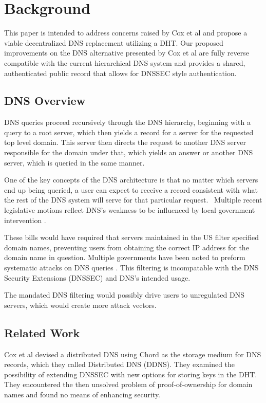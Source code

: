 \documentclass[11pt]{IEEEtran} %
\begin{document}
\section{Background}

This paper is intended to address concerns raised by Cox et al \cite{cox} and propose a viable decentralized DNS replacement utilizing a DHT. Our proposed improvements on the DNS alternative presented by Cox et al are fully reverse compatible with the current hierarchical DNS system and provides a shared, authenticated public record that allows for DNSSEC style authentication.

\subsection{DNS Overview}

DNS queries proceed recursively through the DNS hierarchy, beginning with a query to a root server, which then yields a record for a server for the requested top level domain.  This server then directs the request to another DNS server responsible for the domain under that, which yields an answer or another DNS server, which is queried in the same manner.

One of the key concepts of the DNS architecture is that no matter which servers end up being queried, a user can expect to receive a record consistent with what the rest of the DNS system will serve for that particular request.
\
Multiple recent legislative motions reflect DNS's weakness to be influenced by local government intervention \cite{sopa} \cite{lemley2011don} \cite{crocker2011security}.

These bills would have required that servers maintained in the US filter specified domain names, preventing users from obtaining the correct IP address for the domain name in question. Multiple governments have been noted to preform systematic attacks on DNS queries \cite{inject}. This filtering is incompatable with the DNS Security Extensions (DNSSEC) \cite{crocker2011security} and DNS's intended usage. 

The mandated DNS filtering would possibly drive users to unregulated DNS servers, which would create more attack vectors.


\subsection{Related Work}
Cox et al devised a distributed DNS using Chord \cite{chord} as the storage medium for DNS records, which they called Distributed DNS (DDNS). They examined the possibility of extending DNSSEC with new options for storing keys in the DHT. They encountered the then unsolved problem of proof-of-ownership \cite{bitcoin} for domain names and found no means of enhancing security. 
\end{document}
